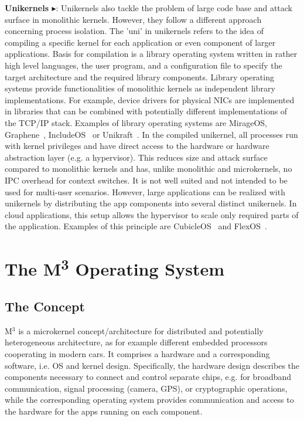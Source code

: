 \textbf{Unikernels\cite{madhavapeddy2014unikernels} $\blacktriangleright$}: Unikernels also tackle the problem of large code base and attack surface in monolithic kernels. However, they follow a different approach concerning process isolation. The 'uni' in unikernels refers to the idea of compiling a specific kernel for each application or even component of larger applications. Basis for compilation is a library operating system written in rather high level languages, the user program, and a configuration file to specify the target architecture and the required library components. Library operating systems provide functionalities of monolithic kernels as independent library implementations. For example, device drivers for physical NICs are implemented in libraries that can be combined with potentially different implementations of the TCP/IP stack. Examples of library operating systems are  MirageOS\cite{madhavapeddy2013unikernels}, Graphene~\cite{tsai2014Graphene}, IncludeOS~\cite{bratterud2015includeos} or Unikraft~\cite{kuenzer2021unikraft}.
In the compiled unikernel, all processes run with kernel privileges and have direct access to the hardware or hardware abstraction layer (e.g. a hypervisor). This reduces size and attack surface compared to monolithic kernels and has, unlike monolithic and microkernels, no IPC overhead for context switches. 
It is not well suited and not intended to be used for multi-user scenarios. However, large applications can be realized with unikernels by distributing the app components into several distinct unikernels. In cloud applications, this setup allows the hypervisor to scale only required parts of the application. Examples of this principle are CubicleOS~\cite{sartakov2021cubicleos} and FlexOS~\cite{lefeuvre2021flexos}.

\section{The M\textsuperscript{3} Operating System}
\subsection{The Concept}
M$^3$\cite{Asmussen:M3x} is a microkernel concept/architecture for distributed and potentially heterogeneous architecture, as for example different embedded processors cooperating in modern cars. It comprises a hardware and a corresponding software, i.e. OS and kernel design. Specifically, the hardware design describes the components necessary to connect and control separate chips, e.g. for broadband communication, signal processing (camera, GPS), or cryptographic operations, while the corresponding operating system provides communication and access to the hardware for the apps running on each component.\\

